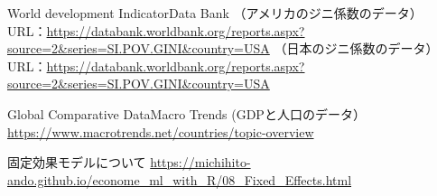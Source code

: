 \documentclass[
]{article}
\begin{document}
World development Indicator\textbar Data Bank
（アメリカのジニ係数のデータ）
URL：\url{https://databank.worldbank.org/reports.aspx?source=2\&series=SI.POV.GINI\&country=USA}
（日本のジニ係数のデータ）
URL：\url{https://databank.worldbank.org/reports.aspx?source=2\&series=SI.POV.GINI\&country=USA}

Global Comparative Data\textbar Macro Trends (GDPと人口のデータ）
\url{https://www.macrotrends.net/countries/topic-overview}

固定効果モデルについて
\url{https://michihito-ando.github.io/econome_ml_with_R/08_Fixed_Effects.html}
\end{document}
